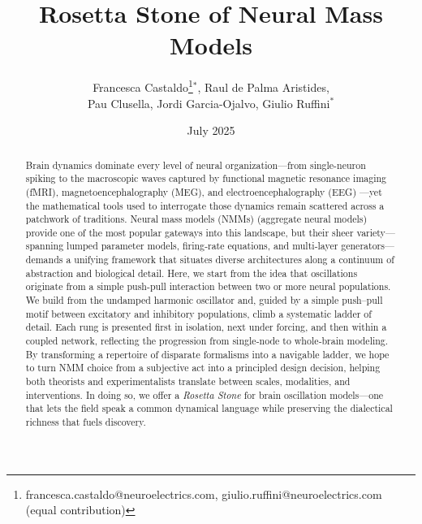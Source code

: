 \documentclass[12pt]{article}
\title{Rosetta Stone of Neural Mass Models \\ }
\author{Francesca Castaldo\thanks{francesca.castaldo@neuroelectrics.com, giulio.ruffini@neuroelectrics.com (equal contribution)}$^*$, Raul de Palma Aristides, \\Pau Clusella, Jordi Garcia-Ojalvo, Giulio Ruffini$^*$}
\date{July 2025}
\numberwithin{equation}{section}
\begin{document}
\maketitle

\begin{abstract}
    Brain dynamics dominate every level of neural organization—from single-neuron spiking to the macroscopic waves captured by functional magnetic resonance imaging (fMRI), magnetoencephalography (MEG), and electroencephalography (EEG) —yet the mathematical tools used to interrogate those dynamics remain scattered across a patchwork of traditions.
    Neural mass models (NMMs) (aggregate neural models) provide one of the most popular gateways into this landscape, but their sheer variety---spanning lumped parameter models, firing‐rate equations, and multi‐layer generators---demands a unifying framework that situates diverse architectures along a continuum of abstraction and biological detail. Here, we start from the idea that oscillations originate from a simple push-pull interaction between two or more neural populations. We build from the undamped harmonic oscillator and, guided by a simple push–pull motif between excitatory and inhibitory populations, climb a systematic ladder of detail.
    Each rung is presented first in isolation, next under forcing, and then within a coupled network, reflecting the progression from single‐node  to whole‐brain modeling. By transforming a repertoire of disparate formalisms into a navigable ladder, we hope to turn NMM choice from a subjective act into a principled design decision, helping both theorists and experimentalists translate between scales, modalities, and interventions. In doing so, we offer a \emph{Rosetta Stone} for brain oscillation models—one that lets the field speak a common dynamical language while preserving the dialectical richness that fuels discovery.
      
\end{abstract}


\clearpage
\end{document}
